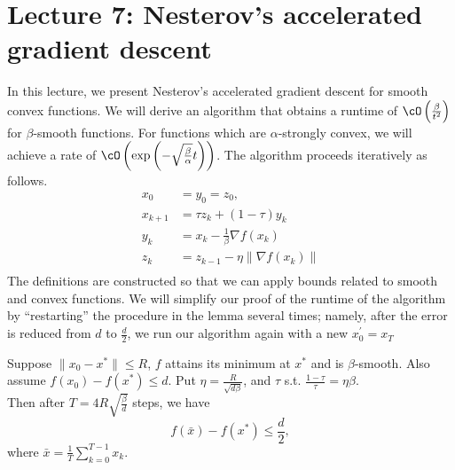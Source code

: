 \section{Lecture 7: Nesterov’s accelerated gradient descent}

In this lecture, we present Nesterov's accelerated gradient descent for smooth convex functions. We will derive an algorithm that obtains a runtime of $\cO \left(\frac{\beta}{t^2}\right)$ for $\beta$-smooth functions. For functions which are $\alpha$-strongly convex, we will achieve a rate of $\cO \left(\exp\left( -\sqrt{\frac{\beta}{\alpha}} t \right) \right)$. The algorithm proceeds iteratively as follows. 
\begin{align*}
x_0 &= y_0 = z_0, \\
x_{k+1} &= \tau z_k + (1 - \tau) y_k \\
y_k &= x_k - \frac{1}{\beta} \nabla f(x_k) \\
z_k &= z_{k -1} - \eta \|\nabla f(x_k)\| \\
\end{align*}
The definitions are constructed so that we can apply bounds related to smooth and convex functions. We will simplify our proof of the runtime of the algorithm by ``restarting'' the procedure in the lemma several times; namely, after the error is reduced from $d$ to $\frac{d}{2}$, we run our algorithm again with a new $x_0^{'} = x_T$

\begin{lemma}
Suppose $\|x_0 - x^* \| \leq R$, $f$ attains its minimum at $x^*$ and is $\beta$-smooth. Also assume $f(x_0) -f(x^*) \leq d$.
Put $\eta = \frac{R}{\sqrt{d\beta}}$, and $\tau$ s.t. $\frac{1-\tau}{\tau} = \eta \beta$.\\
Then after $T = 4R\sqrt{\frac{\beta}{d}}$ steps, we have $$f(\bar{x})- f(x^*) \leq \frac{d}{2},$$ where $\bar{x} = \frac{1}{T} \sum_{k=0}^{T-1} x_k$.
\end{lemma}

